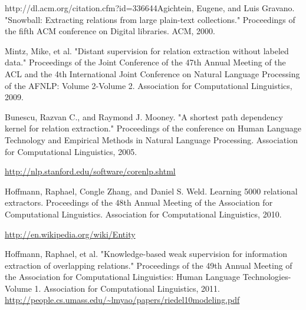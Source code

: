 \begin{thebibliography}{9}
 \label{snowball}
http://dl.acm.org/citation.cfm?id=336644Agichtein, Eugene, and Luis Gravano. "Snowball: Extracting relations from large plain-text collections." Proceedings of the fifth ACM conference on Digital libraries. ACM, 2000.
 
 \label{mintz}
Mintz, Mike, et al. "Distant supervision for relation extraction without labeled data." Proceedings of the Joint Conference of the 47th Annual Meeting of the ACL and the 4th International Joint Conference on Natural Language Processing of the AFNLP: Volume 2-Volume 2. Association for Computational Linguistics, 2009.
 
 \label{shortestpathdep}
Bunescu, Razvan C., and Raymond J. Mooney. "A shortest path dependency kernel for relation extraction." Proceedings of the conference on Human Language Technology and Empirical Methods in Natural Language Processing. Association for Computational Linguistics, 2005.
 
 \label{corenlp}
\url{http://nlp.stanford.edu/software/corenlp.shtml}
 
 \label{rel}
Hoffmann, Raphael, Congle Zhang, and Daniel S. Weld. Learning 5000 relational extractors. Proceedings of the 48th Annual Meeting of the Association for Computational Linguistics. Association for Computational Linguistics, 2010.

 \label{wikientity}
\url{http://en.wikipedia.org/wiki/Entity}

 \label{multir}
Hoffmann, Raphael, et al. "Knowledge-based weak supervision for information extraction of overlapping relations." Proceedings of the 49th Annual Meeting of the Association for Computational Linguistics: Human Language Technologies-Volume 1. Association for Computational Linguistics, 2011.
 \label{riedel}
\url{http://people.cs.umass.edu/~lmyao/papers/riedel10modeling.pdf}

\end{thebibliography}
